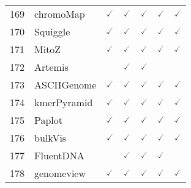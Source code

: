 \documentclass[10pt,letterpaper]{article}
\begin{document}
\begin{table}[!ht]
\begin{adjustwidth}{-2.25in}{0in}
\begin{tabular}{|c|l|c|c|c|c|c|}
169 & chromoMap\cite{singh2014general} & $\checked$ & $\checked$ & $\checked$ & $\checked$ & $\checked$  \\ 
170 & Squiggle\cite{lee2018squiggle} & $\checked$ & $\checked$ & $\checked$ & $\checked$ & $\checked$ \\
171 & MitoZ\cite{meng2018mitoz}  & $\checked$ & $\checked$ & $\checked$ & $\checked$ & $\checked$ \\
172 & Artemis\cite{carver2011artemis} & & $\checked$ & $\checked$ & & \\
173 & ASCIIGenome\cite{beraldi2017asciigenome} & $\checked$ & $\checked$ & $\checked$ & $\checked$ & $\checked$  \\ 
174 & kmerPyramid\cite{kruppa2017kmerpyramid} & $\checked$ & $\checked$ & $\checked$ & $\checked$ & $\checked$  \\ 
175 & Paplot\cite{okada2017framework} & $\checked$ & $\checked$ & $\checked$ & $\checked$ & $\checked$  \\ 
176 & bulkVis\cite{payne2018whale} & $\checked$ & $\checked$ & $\checked$ & $\checked$ & $\checked$  \\ 
177 & FluentDNA\cite{salieb2009dna} & & $\checked$ & $\checked$ & $\checked$ &  \\ 
178 & genomeview\cite{spies2018genomeview} & $\checked$ & $\checked$ & $\checked$ & $\checked$ & $\checked$  \\ \hline
\end{tabular}
\label{table1}
\end{adjustwidth}
\end{table}
\end{document}
